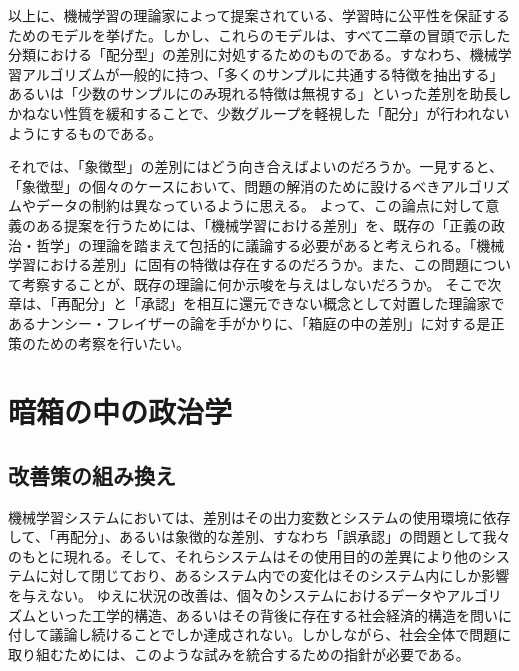\documentclass[b5j,twoside,twocolumn]{utarticle}
\begin{document}
以上に、機械学習の理論家によって提案されている、学習時に公平性を保証するためのモデルを挙げた。しかし、これらのモデルは、すべて二章の冒頭で示した分類における「配分型」の差別に対処するためのものである。すなわち、機械学習アルゴリズムが一般的に持つ、「多くのサンプルに共通する特徴を抽出する」あるいは「少数のサンプルにのみ現れる特徴は無視する」といった差別を助長しかねない性質を緩和することで、少数グループを軽視した「配分」が行われないようにするものである。


それでは、「象徴型」の差別にはどう向き合えばよいのだろうか。一見すると、「象徴型」の個々のケースにおいて、問題の解消のために設けるべきアルゴリズムやデータの制約は異なっているように思える。
よって、この論点に対して意義のある提案を行うためには、「機械学習における差別」を、既存の「正義の政治・哲学」の理論を踏まえて包括的に議論する必要があると考えられる。「機械学習における差別」に固有の特徴は存在するのだろうか。また、この問題について考察することが、既存の理論に何か示唆を与えはしないだろうか。
そこで次章は、「再配分」と「承認」を相互に還元できない概念として対置した理論家であるナンシー・フレイザーの論を手がかりに、「箱庭の中の差別」に対する是正策のための考察を行いたい。

\section{暗箱の中の政治学}
\subsection{改善策の組み換え}


機械学習システムにおいては、差別はその出力変数とシステムの使用環境に依存して、「再配分」、あるいは象徴的な差別、すなわち「誤承認」の問題として我々のもとに現れる。そして、それらシステムはその使用目的の差異により他のシステムに対して閉じており、あるシステム内での変化はそのシステム内にしか影響を与えない。
ゆえに状況の改善は、\.個\.々\.のシステムにおけるデータやアルゴリズムといった工学的構造、あるいはその背後に存在する社会経済的構造を問いに付して議論し続けることでしか達成されない。しかしながら、社会全体で問題に取り組むためには、このような試みを統合するための指針が必要である。
\end{document}
